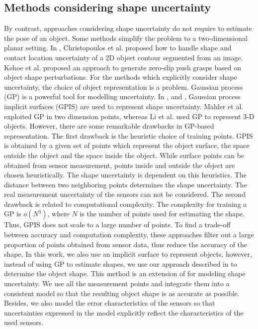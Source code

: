 \subsection{Methods considering shape uncertainty}
By contrast, approaches considering shape uncertainty do not require to estimate the pose of an object. Some methods simplify the problem to a two-dimensional planar setting. In \cite{Christopoulos2007}, Christopoulos et al. proposed how to handle shape and contact location uncertainty of a 2D object contour segmented from an image. Kehoe et al. \cite{Kehoe2012} proposed an approach to generate zero-slip push grasps based on object shape perturbations. For the methods which explicitly consider shape uncertainty, the choice of object representation is a problem. Gaussian process (GP)\cite{rasmussen2006gaussian} is a powerful tool for modelling uncertainty. In \cite{Mahler2015}, \cite{Li2016} and \cite{Dragiev2011}, Gaussian process implicit surfaces (GPIS) \cite{Williams2007} are used to represent  shape uncertainty. Mahler et al. exploited GP in two dimension points, whereas Li et al. used GP to represent 3-D objects. However, there are some remarkable drawbacks in GP-based representation. The first drawback is the heuristic choice of training points. GPIS is obtained by a given set of points which represent the object surface, the space outside the object and the space inside the object. While surface points can be obtained from sensor measurement, points inside and outside the object are chosen heuristically. The shape uncertainty is dependent on this heuristics. The distance between two neighboring points determines the shape uncertainty. The real measurement uncertainty of the sensors can not be considered. The second drawback is related to computational complexity. The complexity for training a GP is $o(N^3)$, where $N$ is the number of points used for estimating the shape. Thus, GPIS does not scale to a large number of points. To find a trade-off between accuracy and computation complexity, these approaches filter out a large proportion of points obtained from sensor data, thus reduce the accuracy of the shape. In this work, we also use an implicit surface to represent objects, however, instead of using GP to estimate shapes, we use our approach described in \cite{Dietrich2016} to determine the object shape. This method is an extension of \cite{newcombe2011kinectfusion} for modeling shape uncertainty. We use all the measurement points and integrate them into a consistent model so that the resulting object shape is as accurate as possible. Besides, we also model the error characteristics of the sensors so that uncertainties expressed in the model explicitly reflect the characteristics of the used sensors. 
